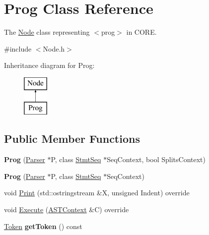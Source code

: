 \hypertarget{class_prog}{}\section{Prog Class Reference}
\label{class_prog}


The \mbox{\hyperlink{class_node}{Node}} class representing {\ttfamily $<$prog$>$} in C\+O\+RE.  




{\ttfamily \#include $<$Node.\+h$>$}

Inheritance diagram for Prog\+:\begin{figure}[H]
\begin{center}
\leavevmode
\includegraphics[height=2.000000cm]{class_prog}
\end{center}
\end{figure}
\subsection*{Public Member Functions}
\begin{DoxyCompactItemize}
\item 
\mbox{\label{class_prog_a4b4d0f98bcbe2ba59652b44341fe897c}} 
{\bfseries Prog} (\mbox{\hyperlink{class_parser}{Parser}} $\ast$P, class \mbox{\hyperlink{class_stmt_seq}{Stmt\+Seq}} $\ast$Seq\+Context, bool Splits\+Context)
\item 
\mbox{\label{class_prog_a387a0b1f34c7ecd03a517d522993e29e}} 
{\bfseries Prog} (\mbox{\hyperlink{class_parser}{Parser}} $\ast$P, class \mbox{\hyperlink{class_stmt_seq}{Stmt\+Seq}} $\ast$Seq\+Context)
\item 
void \mbox{\hyperlink{class_prog_aadfb046d4096b256eea11e3171b8d399}{Print}} (std\+::ostringstream \&X, unsigned Indent) override
\item 
void \mbox{\hyperlink{class_prog_afd95e341f8003d6b5fe6369af3b8975b}{Execute}} (\mbox{\hyperlink{class_a_s_t_context}{A\+S\+T\+Context}} \&C) override
\item 
\mbox{\label{class_prog_ada1f83c5b7ea84a4dcd4eb5dbf833267}} 
\mbox{\hyperlink{class_token}{Token}} {\bfseries get\+Token} () const
\end{DoxyCompactItemize}
